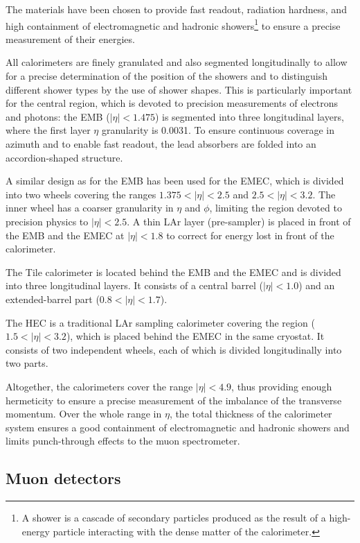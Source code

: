 The materials have been chosen to provide fast readout, 
radiation hardness, and high containment of electromagnetic and
hadronic showers\footnote{A shower is a cascade of secondary particles produced 
as the result of a high-energy particle interacting with the dense matter of the calorimeter.} 
to ensure a precise measurement of their energies.

All calorimeters are finely granulated and also segmented
longitudinally to allow for a precise determination of the position of the showers and to
distinguish different shower types by the use of shower shapes.
This is particularly important for the central region, 
which is devoted to precision measurements of electrons and photons:
the EMB (\mbox{$|\eta| < 1.475$}) is segmented into three longitudinal
layers, where the first layer $\eta$ granularity is 0.0031.
To ensure continuous coverage in azimuth and to enable fast readout, 
the lead absorbers are folded into an accordion-shaped structure.

A similar design as for the EMB has been used for the EMEC, 
which is divided into two wheels covering the ranges \mbox{$1.375 < |\eta| < 2.5$}
and \mbox{$2.5 < |\eta| < 3.2$}.
The inner wheel has a coarser granularity in $\eta$ and $\phi$, 
limiting the region devoted to precision physics to \mbox{$|\eta| < 2.5$}.
A thin LAr layer (pre-sampler) is placed in front of the EMB and the
EMEC at \mbox{$|\eta| < 1.8$} to correct for energy lost in front of the calorimeter.

The Tile calorimeter is located behind the EMB and the EMEC and is divided into three longitudinal layers.
It consists of a central barrel (\mbox{$|\eta| < 1.0$}) and an extended-barrel part (\mbox{$0.8 < |\eta| < 1.7$}).

The HEC is a traditional LAr sampling calorimeter covering the region (\mbox{$1.5 < |\eta| < 3.2$}), which is placed behind the EMEC in the same
cryostat.
It consists of two independent wheels, each of which is divided longitudinally into two parts.

Altogether, the calorimeters cover the range \mbox{$|\eta| < 4.9$},
thus providing enough hermeticity to ensure a precise measurement
of the imbalance of the transverse momentum.
Over the whole range in $\eta$, the total thickness of the calorimeter
system ensures a good containment of
electromagnetic and hadronic showers and limits punch-through effects to the muon spectrometer.

\subsection{Muon detectors}
\label{sec:muonspectrometer}

